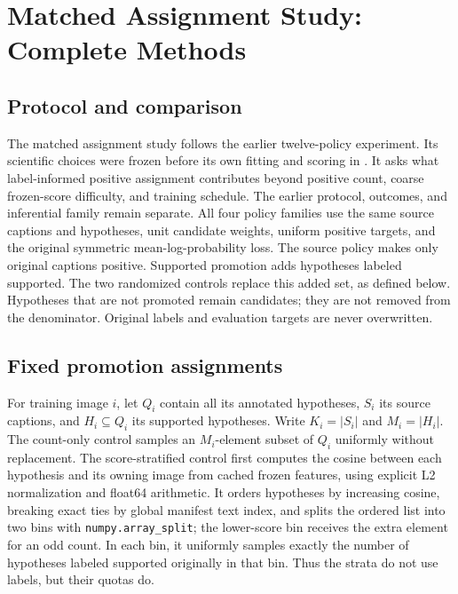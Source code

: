 \section{Matched Assignment Study: Complete Methods}
\label{app:followupmethods}

\subsection{Protocol and comparison}
\label{app:followupscope}
The matched assignment study follows the earlier twelve-policy experiment. Its scientific choices were frozen before its own fitting and scoring in . It asks what label-informed positive assignment contributes beyond positive count, coarse frozen-score difficulty, and training schedule. The earlier protocol, outcomes, and inferential family remain separate. All four policy families use the same source captions and hypotheses, unit candidate weights, uniform positive targets, and the original symmetric mean-log-probability loss. The source policy makes only original captions positive. Supported promotion adds hypotheses labeled supported. The two randomized controls replace this added set, as defined below. Hypotheses that are not promoted remain candidates; they are not removed from the denominator. Original labels and evaluation targets are never overwritten.

\subsection{Fixed promotion assignments}
\label{app:followupcontrols}
For training image $i$, let $Q_i$ contain all its annotated hypotheses, $S_i$ its source captions, and $H_i\subseteq Q_i$ its supported hypotheses. Write $K_i=|S_i|$ and $M_i=|H_i|$. The count-only control samples an $M_i$-element subset of $Q_i$ uniformly without replacement. The score-stratified control first computes the cosine between each hypothesis and its owning image from cached frozen features, using explicit L2 normalization and float64 arithmetic. It orders hypotheses by increasing cosine, breaking exact ties by global manifest text index, and splits the ordered list into two bins with \texttt{numpy.array\_split}; the lower-score bin receives the extra element for an odd count. In each bin, it uniformly samples exactly the number of hypotheses labeled supported originally in that bin. Thus the strata do not use labels, but their quotas do.


